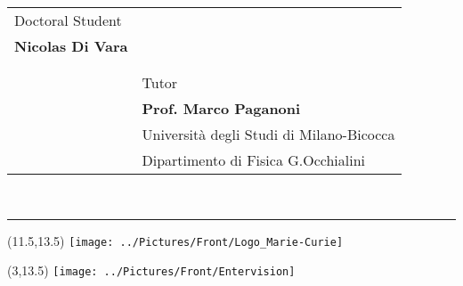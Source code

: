 \begin{center}
\vspace{80pt} 
\centering
\begin{tabular}{p{10cm}p{}}
\large Doctoral Student &  \\
\Large \bfseries Nicolas Di Vara & \\
 & \\
 & \\
 & \large Tutor \\
 &\Large \bfseries Prof. Marco Paganoni\\
 &\large Universit\`a degli Studi di Milano-Bicocca\\
 &\large Dipartimento di Fisica G.Occhialini\\
\end{tabular}
\vspace{10pt} \\
\hrule \vspace{6pt}
\large 

\begin{textblock}{1}(11.5,13.5)
\texttt{[image: ../Pictures/Front/Logo\_Marie-Curie]}
\end{textblock}
\begin{textblock}{1}(3,13.5)
\texttt{[image: ../Pictures/Front/Entervision]}
\end{textblock}
\end{center}

